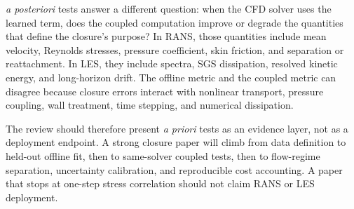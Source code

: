 \documentclass[11pt]{article}
\newcommand{\apriori}{\textit{a priori}}
\newcommand{\aposteriori}{\textit{a posteriori}}
\begin{document}
\aposteriori{} tests answer a different question: when the CFD solver uses the learned term, does the coupled computation improve or degrade the quantities that define the closure's purpose? In RANS, those quantities include mean velocity, Reynolds stresses, pressure coefficient, skin friction, and separation or reattachment. In LES, they include spectra, SGS dissipation, resolved kinetic energy, and long-horizon drift. The offline metric and the coupled metric can disagree because closure errors interact with nonlinear transport, pressure coupling, wall treatment, time stepping, and numerical dissipation.

The review should therefore present \apriori{} tests as an evidence layer, not as a deployment endpoint. A strong closure paper will climb from data definition to held-out offline fit, then to same-solver coupled tests, then to flow-regime separation, uncertainty calibration, and reproducible cost accounting. A paper that stops at one-step stress correlation should not claim RANS or LES deployment.
\end{document}
